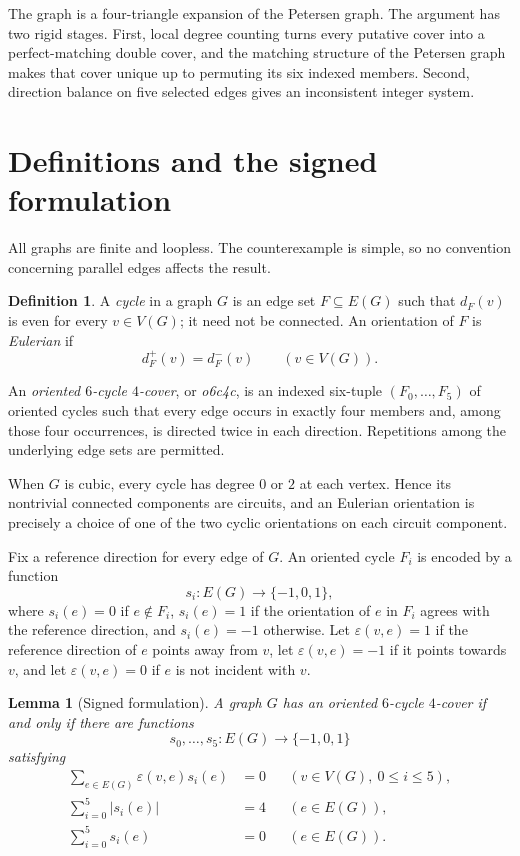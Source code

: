 \documentclass[11pt]{article}
\newtheorem{lemma}[theorem]{Lemma}
\theoremstyle{definition}
\newtheorem{definition}[theorem]{Definition}
\begin{document}
The graph is a four-triangle expansion of the Petersen graph.  The argument
has two rigid stages.  First, local degree counting turns every putative cover
into a perfect-matching double cover, and the matching structure of the
Petersen graph makes that cover unique up to permuting its six indexed
members.  Second, direction balance on five selected edges gives an
inconsistent integer system.

\section{Definitions and the signed formulation}

All graphs are finite and loopless.  The counterexample is simple, so no
convention concerning parallel edges affects the result.

\begin{definition}\label{def:o6c4c}
A \emph{cycle} in a graph $G$ is an edge set $F\subseteq E(G)$ such that
$d_F(v)$ is even for every $v\in V(G)$; it need not be connected.  An
orientation of $F$ is \emph{Eulerian} if
\[
d_F^+(v)=d_F^-(v)\qquad(v\in V(G)).
\]

An \emph{oriented $6$-cycle $4$-cover}, or \emph{o6c4c}, is an indexed
six-tuple $(F_0,\ldots,F_5)$ of oriented cycles such that every edge occurs in
exactly four members and, among those four occurrences, is directed twice in
each direction.  Repetitions among the underlying edge sets are permitted.
\end{definition}

When $G$ is cubic, every cycle has degree $0$ or $2$ at each vertex.  Hence
its nontrivial connected components are circuits, and an Eulerian orientation
is precisely a choice of one of the two cyclic orientations on each circuit
component.

Fix a reference direction for every edge of $G$.  An oriented cycle $F_i$ is
encoded by a function
\[
s_i\colon E(G)\longrightarrow\{-1,0,1\},
\]
where $s_i(e)=0$ if $e\notin F_i$, $s_i(e)=1$ if the orientation of $e$ in
$F_i$ agrees with the reference direction, and $s_i(e)=-1$ otherwise.
Let $\varepsilon(v,e)=1$ if the reference direction of $e$ points away from
$v$, let $\varepsilon(v,e)=-1$ if it points towards $v$, and let
$\varepsilon(v,e)=0$ if $e$ is not incident with $v$.

\begin{lemma}[Signed formulation]\label{lem:signed}
A graph $G$ has an oriented $6$-cycle $4$-cover if and only if there are
functions
\[
s_0,\ldots,s_5\colon E(G)\longrightarrow\{-1,0,1\}
\]
satisfying
\begin{align}
\sum_{e\in E(G)}\varepsilon(v,e)s_i(e)&=0
    &&(v\in V(G),\ 0\leq i\leq5), \label{eq:flow}\\
\sum_{i=0}^{5}|s_i(e)|&=4
    &&(e\in E(G)), \label{eq:support}\\
\sum_{i=0}^{5}s_i(e)&=0
    &&(e\in E(G)). \label{eq:balance}
\end{align}
\end{lemma}
\end{document}
